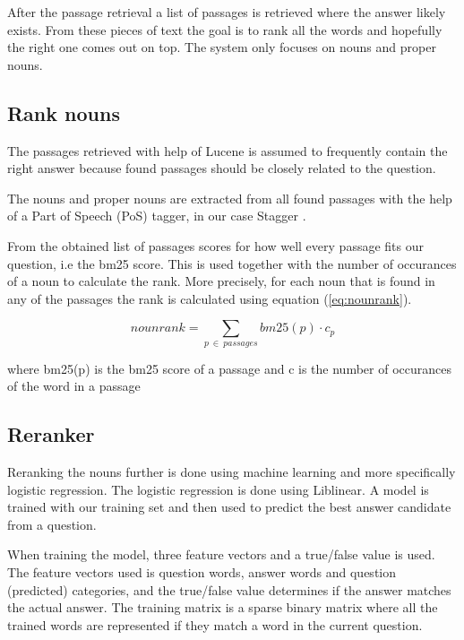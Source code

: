 After the passage retrieval a list of passages is retrieved where the answer likely exists. 
From these pieces of text the goal is to rank all the words and hopefully the right one comes out on top.
The system only focuses on nouns and proper nouns.

\subsection{Rank nouns}

The passages retrieved with help of Lucene is assumed to frequently contain the right answer
because found passages should be closely related to the question.

The nouns and proper nouns are extracted from all found passages with the help of a Part of Speech (PoS) 
tagger, in our case Stagger \cite{stagger}.

From the obtained list of passages scores for how well every passage fits our question, i.e the bm25 score. 
This is used together with the number of occurances of a noun to calculate the rank.
More precisely, for each noun that is found in any of the passages the rank is calculated using equation (\ref{eq:nounrank}).

\begin{equation}
nounrank = \sum_{p\:\in\:passages}bm25(p) \cdot c_p
\label{eq:nounrank}
\end{equation}

where bm25(p) is the bm25 score of a passage and c is the number of occurances of the word in a passage

\subsection{Reranker}

Reranking the nouns further is done using machine learning and more specifically logistic regression.
The logistic regression is done using Liblinear. \cite{liblinear}
A model is trained with our training set and then used to predict the best answer candidate from a question.

When training the model, three feature vectors and a true/false value is used. 
The feature vectors used is question words, answer words and question (predicted) categories, and the true/false
value determines if the answer matches the actual answer. The training matrix is a sparse binary matrix where 
all the trained words are represented if they match a word in the current question.

